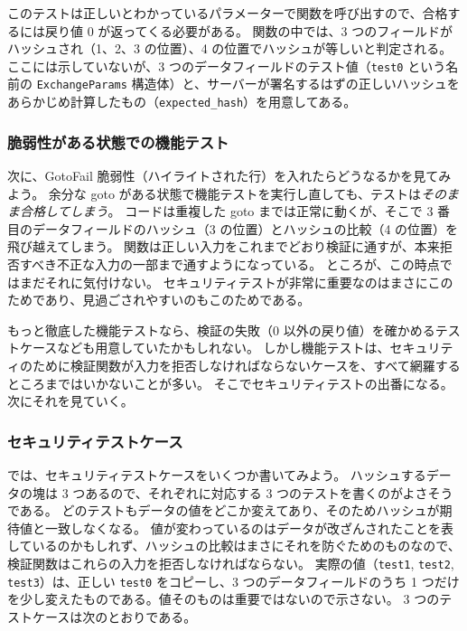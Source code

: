 \documentclass[uplatex]{jsarticle}
\begin{document}
このテストは正しいとわかっているパラメーターで関数を呼び出すので、合格するには戻り値 0 が返ってくる必要がある。
関数の中では、3 つのフィールドがハッシュされ（1、2、3 の位置）、4 の位置でハッシュが等しいと判定される。
ここには示していないが、3 つのデータフィールドのテスト値（\texttt{test0} という名前の \texttt{ExchangeParams} 構造体）と、サーバーが署名するはずの正しいハッシュをあらかじめ計算したもの（\texttt{expected\_hash}）を用意してある。

\subsubsection{脆弱性がある状態での機能テスト}

次に、GotoFail 脆弱性（ハイライトされた行）を入れたらどうなるかを見てみよう。
余分な goto がある状態で機能テストを実行し直しても、テストは\emph{そのまま合格してしまう}。
コードは重複した goto までは正常に動くが、そこで 3 番目のデータフィールドのハッシュ（3 の位置）とハッシュの比較（4 の位置）を飛び越えてしまう。
関数は正しい入力をこれまでどおり検証に通すが、本来拒否すべき不正な入力の一部まで通すようになっている。
ところが、この時点ではまだそれに気付けない。
セキュリティテストが非常に重要なのはまさにこのためであり、見過ごされやすいのもこのためである。

もっと徹底した機能テストなら、検証の失敗（0 以外の戻り値）を確かめるテストケースなども用意していたかもしれない。
しかし機能テストは、セキュリティのために検証関数が入力を拒否しなければならないケースを、すべて網羅するところまではいかないことが多い。
そこでセキュリティテストの出番になる。次にそれを見ていく。

\subsubsection{セキュリティテストケース}

では、セキュリティテストケースをいくつか書いてみよう。
ハッシュするデータの塊は 3 つあるので、それぞれに対応する 3 つのテストを書くのがよさそうである。
どのテストもデータの値をどこか変えてあり、そのためハッシュが期待値と一致しなくなる。
値が変わっているのはデータが改ざんされたことを表しているのかもしれず、ハッシュの比較はまさにそれを防ぐためのものなので、検証関数はこれらの入力を拒否しなければならない。
実際の値（\texttt{test1}, \texttt{test2}, \texttt{test3}）は、正しい \texttt{test0} をコピーし、3 つのデータフィールドのうち 1 つだけを少し変えたものである。値そのものは重要ではないので示さない。
3 つのテストケースは次のとおりである。
\end{document}
